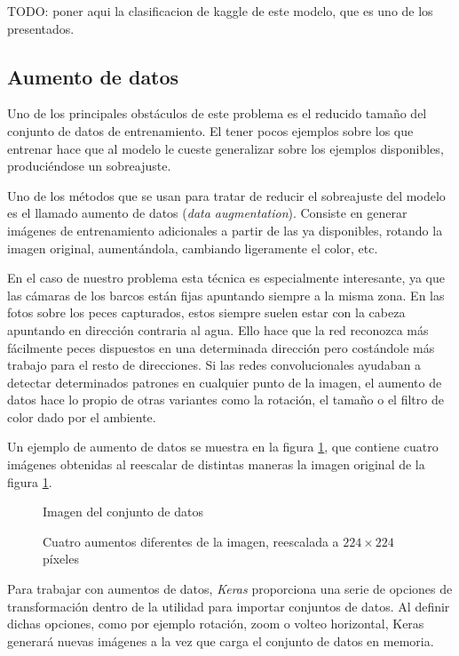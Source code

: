 TODO: poner aqui la clasificacion de kaggle de este modelo, que es uno de los presentados.


\subsection{Aumento de datos}

Uno de los principales obstáculos de este problema es el reducido tamaño del conjunto de datos de entrenamiento. El tener pocos ejemplos sobre los que entrenar hace que al modelo le cueste generalizar sobre los ejemplos disponibles, produciéndose un sobreajuste.

Uno de los métodos que se usan para tratar de reducir el sobreajuste del modelo es el llamado aumento de datos (\textit{data augmentation}). Consiste en generar imágenes de entrenamiento adicionales a partir de las ya disponibles, rotando la imagen original, aumentándola, cambiando ligeramente el color, etc.

En el caso de nuestro problema esta técnica es especialmente interesante, ya que las cámaras de los barcos están fijas apuntando siempre a la misma zona. En las fotos sobre los peces capturados, estos siempre suelen estar con la cabeza apuntando en dirección contraria al agua. Ello hace que la red reconozca más fácilmente peces dispuestos en una determinada dirección pero costándole más trabajo para el resto de direcciones. Si las redes convolucionales ayudaban a detectar determinados patrones en cualquier punto de la imagen, el aumento de datos hace lo propio de otras variantes como la rotación, el tamaño o el filtro de color dado por el ambiente.

Un ejemplo de aumento de datos se muestra en la figura \ref{aug-original}, que contiene cuatro imágenes obtenidas al reescalar de distintas maneras la imagen original de la figura \ref{aug-original}.

\begin{figure}
    \caption{Imagen del conjunto de datos}
\label{aug-original}
\end{figure}

\begin{figure}
    \caption{Cuatro aumentos diferentes de la imagen, reescalada a $224\times224$ píxeles}
\label{augmentations}
\end{figure}

Para trabajar con aumentos de datos, \textit{Keras} proporciona una serie de opciones de transformación dentro de la utilidad para importar conjuntos de datos. Al definir dichas opciones, como por ejemplo rotación, zoom o volteo horizontal, Keras generará nuevas imágenes a la vez que carga el conjunto de datos en memoria.

